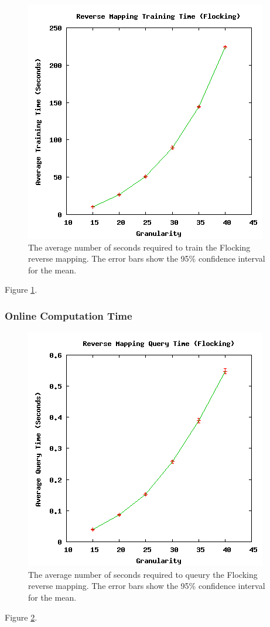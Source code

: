\begin{figure}[ht]
\centering
\includegraphics[scale=.5]{images/results_flocking/rmtraining.png}
\caption{The average number of seconds required to train the Flocking reverse mapping.
The error bars show the 95\% confidence interval for the mean.}
\label{fig:flockrmtraining}
\end{figure}

Figure \ref{fig:flockrmtraining}.

  \subsubsection{Online Computation Time}

\begin{figure}[ht]
\centering
\includegraphics[scale=.5]{images/results_flocking/rmquery.png}
\caption{The average number of seconds required to queury the Flocking reverse mapping.
The error bars show the 95\% confidence interval for the mean.}
\label{fig:flockrmquery}
\end{figure}

Figure \ref{fig:flockrmquery}.




